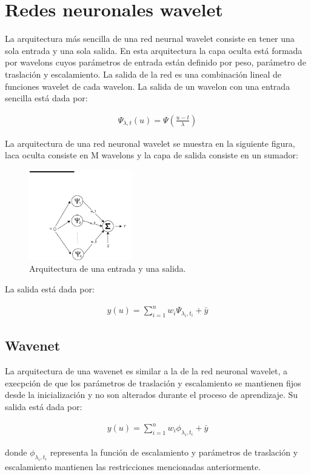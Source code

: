 \section{Redes neuronales wavelet}
La arquitectura más sencilla de una red neurnal wavelet consiste en tener una
sola entrada y una sola salida. En esta arquitectura la capa oculta está
formada por wavelons cuyos parámetros de entrada están definido por peso,
parámetro de traslación y escalamiento. La salida de la red es una combinación
lineal de funciones wavelet de cada wavelon. La salida de un wavelon con una
entrada sencilla está dada por:

\begin{eqnarray*}
    \Psi_{\lambda,t}(u) = \Psi\left(\frac{u-t}{\lambda}\right)
\end{eqnarray*}

La arquitectura de una red neuronal wavelet se muestra en la siguiente figura,
laca oculta consiste en M wavelons y la capa de salida consiste en un sumador:

\begin{figure}[h!t]
    \begin{center}
        \includegraphics[width=0.4\textwidth]{images/1_in_1_out}
        \caption{Arquitectura de una entrada y una salida.}
    \end{center}
\end{figure}

La salida está dada por:

\begin{eqnarray*}
    y(u) = \sum_{i=1}^{n} w_i\Psi_{\lambda_i,t_i} + \bar{y}
\end{eqnarray*}

\subsection{Wavenet}
La arquitectura de una wavenet es similar a la de la red neuronal wavelet, a
execpción de que los parámetros de traslación y escalamiento se mantienen fijos
desde la inicialización y no son alterados durante el proceso de aprendizaje.
Su salida está dada por:

\begin{eqnarray*}
    y(u) = \sum_{i=1}^{n} w_i\phi_{\lambda_i,t_i} + \bar{y}
\end{eqnarray*}

donde $\phi_{\lambda_i,t_i}$ representa la función de escalamiento y parámetros
de traslación y escalamiento mantienen las restricciones mencionadas
anteriormente.
